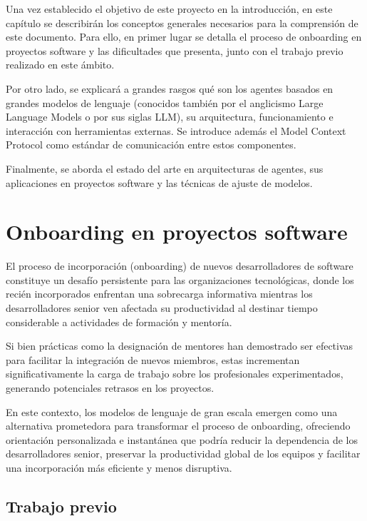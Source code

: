 Una vez establecido el objetivo de este proyecto en la introducción, en este capítulo se describirán los conceptos generales necesarios para la comprensión de este documento. Para ello, en primer lugar se detalla el proceso de onboarding en proyectos software y las dificultades que presenta, junto con el trabajo previo realizado en este ámbito.

Por otro lado, se explicará a grandes rasgos qué son los agentes basados en grandes modelos de lenguaje (conocidos también por el anglicismo Large Language Models o por sus siglas LLM), su arquitectura, funcionamiento e interacción con herramientas externas. Se introduce además el Model Context Protocol como estándar de comunicación entre estos componentes.

Finalmente, se aborda el estado del arte en arquitecturas de agentes, sus aplicaciones en proyectos software y las técnicas de ajuste de modelos.

\section{Onboarding en proyectos software}
El proceso de incorporación (onboarding) de nuevos desarrolladores de software constituye un desafío persistente para las organizaciones tecnológicas, donde los recién incorporados enfrentan una sobrecarga informativa mientras los desarrolladores senior ven afectada su productividad al destinar tiempo considerable a actividades de formación y mentoría\cite{sim_ramp-up_1998}. 

Si bien prácticas como la designación de mentores han demostrado ser efectivas para facilitar la integración de nuevos miembros, estas incrementan significativamente la carga de trabajo sobre los profesionales experimentados, generando potenciales retrasos en los proyectos\cite{steinmacher_systematic_2015}.

En este contexto, los modelos de lenguaje de gran escala emergen como una alternativa prometedora para transformar el proceso de onboarding, ofreciendo orientación personalizada e instantánea que podría reducir la dependencia de los desarrolladores senior, preservar la productividad global de los equipos y facilitar una incorporación más eficiente y menos disruptiva\cite{ritz_artificial_2023}.

\subsection{Trabajo previo}

